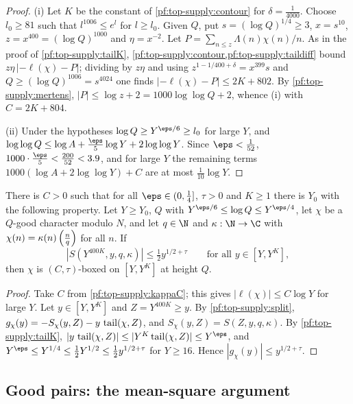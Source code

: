 \begin{proof}
(i) Let $K$ be the constant of \cref{pf:top-supply:contour} for $\delta=\frac1{4000}$. Choose $l_0\ge81$ such that
$l^{1006}\le e^l$ for $l\ge l_0$. Given $Q$, put $s=(\log Q)^{1/4}\ge3$, $x=s^{10}$, $z=x^{400}=(\log Q)^{1000}$ and
$\eta=x^{-2}$. Let $P=\sum_{n\le z}\Lambda(n)\chi(n)/n$. As in the proof of \cref{pf:top-supply:tailK},
\cref{pf:top-supply:contour,pf:top-supply:taildiff} bound $z\eta\,|{-\ell(\chi)}-P|$; dividing by $z\eta$ and using
$z^{1-1/400+\delta}=x^{399}s$ and $Q\ge(\log Q)^{1006}=s^{4024}$ one finds $|{-\ell(\chi)}-P|\le2K+802$. By
\cref{pf:top-supply:mertens}, $|P|\le\log z+2=1000\log\log Q+2$, whence (i) with $C=2K+804$.

(ii) Under the hypotheses $\log Q\ge Y^{\eps/6}\ge l_0$ for large $Y$, and
$\log\log Q\le\log A+\frac\eps5\log Y+2\log\log Y$. Since $\eps<\frac1{52}$, $1000\cdot\frac\eps5<\frac{200}{52}<3.9$,
and for large $Y$ the remaining terms $1000(\log A+2\log\log Y)+C$ are at most $\frac1{10}\log Y$.
\end{proof}

\begin{lemma}\label{pf:top-supply:boxofS}
There is $C>0$ such that for all $\eps\in(0,\frac14]$, $\tau>0$ and $K\ge1$ there is $Y_0$ with the following property.
Let $Y\ge Y_0$, $Q$ with $Y^{\eps/6}\le\log Q\le Y^{\eps/4}$, let $\chi$ be a $Q$-good character modulo $N$, and let $q\in\N$
and $\kappa:\N\to\C$ with $\chi(n)=\kappa(n)\left(\frac{n}{q}\right)$ for all $n$. If
\[
|S(Y^{400K},y,q,\kappa)|\le\tfrac12y^{1/2+\tau}\qquad\text{for all }y\in[Y,Y^K],
\]
then $\chi$ is $(C,\tau)$-boxed on $[Y,Y^K]$ at height $Q$. 
\end{lemma}

\begin{proof}
Take $C$ from \cref{pf:top-supply:kappaC}; this gives $|\ell(\chi)|\le C\log Y$ for large $Y$. Let $y\in[Y,Y^K]$ and
$Z=Y^{400K}\ge y$. By \cref{pf:top-supply:split}, $g_\chi(y)=-S_\chi(y,Z)-y\,\operatorname{tail}(\chi,Z)$, and
$S_\chi(y,Z)=S(Z,y,q,\kappa)$. By \cref{pf:top-supply:tailK}, $|y\,\topsupplytail(\chi,Z)|\le
|Y^K\topsupplytail(\chi,Z)|\le Y^\eps$, and $Y^\eps\le Y^{1/4}\le\frac12Y^{1/2}\le\frac12y^{1/2+\tau}$ for $Y\ge16$.
Hence $|g_\chi(y)|\le y^{1/2+\tau}$.
\end{proof}

\subsection{Good pairs: the mean-square argument}\label{sec:pf:top-supply:meansq}

